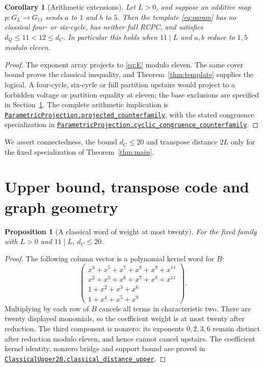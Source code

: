 \documentclass[11pt]{article}
\makeatletter
\newtheorem{proposition}[theorem]{Proposition}
\newtheorem{corollary}[theorem]{Corollary}
\theoremstyle{definition}\newtheorem{definition}[theorem]{Definition}
\newcommand{\proofcommit}{98eb91cd9049e6a88887a5ba79150ad96a4a3e53}
\newcommand{\proofbase}{https://github.com/alectionary/vibe-math/blob/\proofcommit/formalization/distance-preservation}
\newcommand{\lean}[2]{\href{\proofbase/#1.lean\#L\csname leanline@#2\endcsname}{\nolinkurl{#2}}}
\makeatother
\begin{document}
\begin{corollary}[Arithmetic extensions]\label{cor:param}
Let $L>0$, and suppose an additive map $p:G_L\to G_{11}$ sends
$a$ to $1$ and $b$ to $5$. Then the template \eqref{eq:param} has
no classical four- or six-cycle, has neither full RCPC, and satisfies
$d_Q\leq11<12\leq d_C$. In particular this holds when $11\mid L$
and $a,b$ reduce to $1,5$ modulo eleven.
\end{corollary}
\begin{proof}
The exponent array projects to \eqref{eq:E} modulo eleven. The same
cover bound proves the classical inequality, and
Theorem~\ref{thm:template} supplies the logical. A four-cycle, six-cycle
or full partition upstairs would project to a forbidden voltage or
partition equality at eleven; the base exclusions are specified in
Section~\ref{sec:geometry}. The complete arithmetic implication is
\lean{ParametricProjection}{ParametricProjection.projected_counterfamily},
with the stated congruence specialization in
\lean{ParametricProjection}{ParametricProjection.cyclic_congruence_counterfamily}.
\end{proof}
We assert connectedness, the bound $d_C\leq20$ and transpose distance
$2L$ only for the fixed specialization of Theorem~\ref{thm:main}.

\section{Upper bound, transpose code and graph geometry}\label{sec:geometry}

\begin{proposition}[A classical word of weight at most twenty]\label{prop:upper}
For the fixed family with $L>0$ and $11\mid L$, $d_C\leq20$.
\end{proposition}
\begin{proof}
The following column vector is a polynomial kernel word for $B$:
\begin{equation}\label{eq:twenty}
 \begin{pmatrix}
 x^4+x^5+x^7+x^8+x^9+x^{11}\\
 x^2+x^3+x^6+x^7+x^8+x^{11}\\
 1+x^2+x^3+x^6\\
 1+x^4+x^5+x^9
 \end{pmatrix}.
\end{equation}
Multiplying by each row of $B$ cancels all terms in characteristic two.
There are twenty displayed monomials, so the coefficient weight is at
most twenty after reduction. The third component is nonzero: its
exponents $0,2,3,6$ remain distinct after reduction modulo eleven,
and hence cannot cancel upstairs. The coefficient kernel identity,
nonzero bridge and support bound are proved in
\lean{ClassicalUpper20}{ClassicalUpper20.classical_distance_upper}.
\end{proof}
\end{document}
